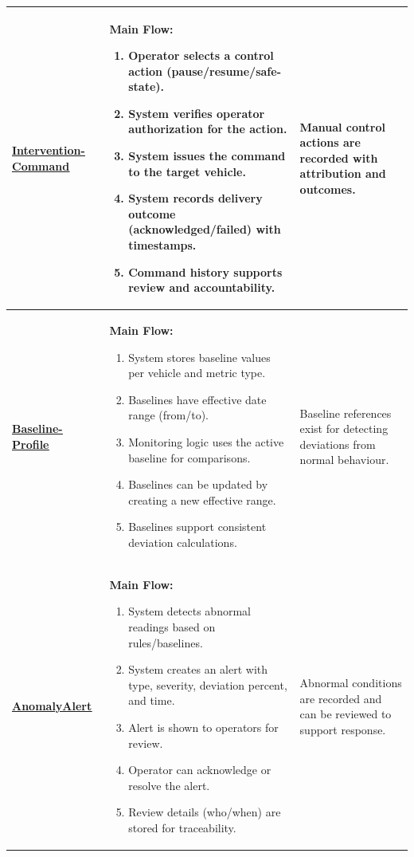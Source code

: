\documentclass[11pt,a4paper]{article}
\let\orighyperref\hyperref
\renewcommand{\hyperref}[2][]{\orighyperref[#1]{\uline{#2}}}%
\begin{document}
\begin{longtable}{|>{\raggedright\arraybackslash}p{}|>{\raggedright\arraybackslash}p{}|>{\raggedright\arraybackslash}p{}|}
\textbf{\hyperref[tab:data-dictionary-interventioncommand]{Intervention-\allowbreak Command}}\label{flow-InterventionCommand} &
\textbf{Main Flow:}\begin{enumerate}[leftmargin=*,nosep]
  \item Operator selects a control action (pause/resume/safe-state).
  \item System verifies operator authorization for the action.
  \item System issues the command to the target vehicle.
  \item System records delivery outcome (acknowledged/failed) with timestamps.
  \item Command history supports review and accountability.
\end{enumerate} &
Manual control actions are recorded with attribution and outcomes. \\
\hline

\textbf{\hyperref[tab:data-dictionary-baselineprofile]{Baseline-\allowbreak Profile}}\label{flow-BaselineProfile} &
\textbf{Main Flow:}\begin{enumerate}[leftmargin=*,nosep]
  \item System stores baseline values per vehicle and metric type.
  \item Baselines have effective date range (from/to).
  \item Monitoring logic uses the active baseline for comparisons.
  \item Baselines can be updated by creating a new effective range.
  \item Baselines support consistent deviation calculations.
\end{enumerate} &
Baseline references exist for detecting deviations from normal behaviour. \\
\hline

\textbf{\hyperref[tab:data-dictionary-anomalyalert]{AnomalyAlert}}\label{flow-AnomalyAlert} &
\textbf{Main Flow:}\begin{enumerate}[leftmargin=*,nosep]
  \item System detects abnormal readings based on rules/baselines.
  \item System creates an alert with type, severity, deviation percent, and time.
  \item Alert is shown to operators for review.
  \item Operator can acknowledge or resolve the alert.
  \item Review details (who/when) are stored for traceability.
\end{enumerate} &
Abnormal conditions are recorded and can be reviewed to support response. \\
\hline


\end{longtable}
\end{document}
